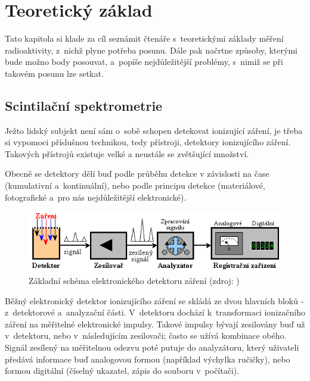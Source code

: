 \chapter{Teoretický základ}
\label{2-teorie}

Tato kapitola si klade za cíl seznámit čtenáře s~teoretickými základy měření radioaktivity, z~nichž
plyne potřeba posunu. Dále pak načrtne způsoby, kterými bude možno body posouvat, a~popíše
nejdůležitější problémy, s~nimiž se při takovém posunu lze setkat. 

\section{Scintilační spektrometrie}
\label{spektrometrie}

Ježto lidský subjekt není sám o~sobě schopen detekovat ionizující záření, je třeba si vypomoci příslušnou
technikou, tedy přístroji, detektory ionizujícího záření. Tako\-vých přístrojů existuje velké
a neustále se zvětšující množství. 

Obecně se detektory dělí buď podle průběhu detekce v závislosti na čase (kumulativní a~kontinuální),
nebo podle principu detekce (materiálové, fotografické a~pro nás nejdůležitější elektronické). 

  \begin{figure}[H]
   \centering
	\includegraphics{./pictures/elektronicky-detektor.png}
	\caption[Základní schéma elektronického detektoru záření]{Základní schéma elektronického
	detektoru záření
	(zdroj: \cite{spektrometrie})}
      \label{fig:elektronicky-detektor}
  \end{figure}

Běžný elektronický detektor ionizujícího záření se skládá ze dvou hlavních bloků - z~detektorové
a~analyzační části. V~detektoru dochází k~transformaci ionizačního záření na měřitelné
elektronické impulsy. Takové impulsy bývají zesilovány buď už v~detektoru, nebo v~následujícím
zesilovači; často se užívá kombinace obého. Signál zesílený na měřitelnou odezvu poté putuje do
analyzátoru, který uživateli předává informace buď analogovou formou (například výchylka ručičky),
nebo formou di\-gitální (číselný ukazatel, zápis do souboru v~počítači). 

